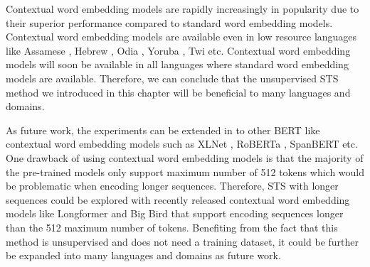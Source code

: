 Contextual word embedding models are rapidly increasingly in popularity due to their superior performance compared to standard word embedding models. Contextual word embedding models are available even in low resource languages like Assamese \autocite{kakwani-etal-2020-indicnlpsuite}, Hebrew \autocite{chriqui2021hebert}, Odia \autocite{kakwani-etal-2020-indicnlpsuite}, Yoruba \autocite{alabi-etal-2020-massive}, Twi \autocite{alabi-etal-2020-massive} etc.  Contextual word embedding models will soon be available in all languages where standard word embedding models are available. Therefore, we can conclude that the unsupervised STS method we introduced in this chapter will be beneficial to many languages and domains. 

As future work, the experiments can be extended in to other BERT like contextual word embedding models such as XLNet \autocite{yang2019xlnet}, RoBERTa \autocite{liu2019roberta}, SpanBERT \autocite{joshi-etal-2020-spanbert} etc. One drawback of using contextual word embedding models is that the majority of the pre-trained models only support maximum number of 512 tokens which would be problematic when encoding longer sequences. Therefore, STS with longer sequences could be explored with recently released contextual word embedding models like Longformer \autocite{beltagy2020}  and Big Bird \autocite{zaheer2021} that support encoding sequences longer than the 512 maximum number of tokens. Benefiting from the fact that this method is unsupervised and does not need a training dataset, it could be further be expanded into many languages and domains as future work.  

